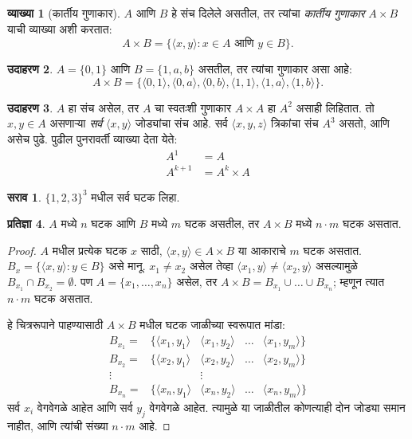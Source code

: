 \documentclass[11pt,a4paper,openany]{book}
\theoremstyle{definition}
\newtheorem{defn}{व्याख्या}[section]
\newtheorem{ex}[defn]{उदाहरण}
\newtheorem{prop}[defn]{प्रतिज्ञा}
\newtheorem{prob}{सराव}[chapter]
\newcommand{\Setabs}[2]{\{#1:#2\}}
\newcommand{\tuple}[1]{\langle #1\rangle}
\begin{document}
\begin{defn}[कार्तीय गुणाकार]
$A$ आणि $B$ हे संच दिलेले असतील, तर त्यांचा \emph{कार्तीय गुणाकार}
$A \times B$ याची व्याख्या अशी करतात:
\[
  A \times B = \Setabs{\tuple{x, y}}{x \in A \text{ आणि } y \in B}.
\]
\end{defn}

\begin{ex}
$A = \{0, 1\}$ आणि $B = \{1, a, b\}$ असतील, तर त्यांचा गुणाकार असा आहे:
\[
A \times B = \{ \tuple{0, 1}, \tuple{0, a}, \tuple{0, b},
    \tuple{1, 1}, \tuple{1, a}, \tuple{1, b} \}.
\]
\end{ex}

\begin{ex}
$A$ हा संच असेल, तर $A$ चा स्वतःशी गुणाकार $A \times A$ हा $A^2$
असाही लिहितात. तो $x, y \in A$ असणाऱ्या \emph{सर्व} $\tuple{x, y}$ जोड्यांचा
संच आहे. सर्व $\tuple{x, y, z}$ त्रिकांचा संच $A^3$ असतो, आणि असेच पुढे.
पुढील पुनरावर्ती व्याख्या देता येते:
\begin{align*}
  A^1 & = A\\
  A^{k+1} & = A^k \times A
\end{align*}
\end{ex}

\begin{prob}
$\{1, 2, 3\}^3$ मधील सर्व घटक लिहा.
\end{prob}

\begin{prop}\label{sfr:set:pai:cardnmprod}
$A$ मध्ये $n$ घटक आणि $B$ मध्ये $m$ घटक असतील,
तर $A
\times B$ मध्ये $n\cdot m$ घटक असतात.
\end{prop}

\begin{proof}
$A$ मधील प्रत्येक घटक $x$ साठी, $\tuple{x, y} \in A \times B$
या आकाराचे $m$ घटक असतात.
$B_x = \Setabs{\tuple{x, y}}{y
  \in B}$ असे मानू. $x_1 \neq x_2$ असेल तेव्हा $\tuple{x_1, y} \neq
\tuple{x_2, y}$ असल्यामुळे $B_{x_1} \cap B_{x_2} = \emptyset$.
पण $A = \{x_1,
\dots, x_n\}$ असेल, तर $A \times B = B_{x_1} \cup \dots \cup B_{x_n}$;
म्हणून त्यात $n\cdot m$ घटक असतात.

हे चित्ररूपाने पाहण्यासाठी $A \times B$ मधील घटक जाळीच्या स्वरूपात मांडा:
\[
\begin{array}{rcccc}
  B_{x_1} = & \{\tuple{x_1, y_1} & \tuple{x_1, y_2} & \dots & \tuple{x_1, y_m}\}\\
  B_{x_2} = & \{\tuple{x_2, y_1} & \tuple{x_2, y_2} & \dots & \tuple{x_2, y_m}\}\\
  \vdots & & \vdots\\
  B_{x_n} = & \{\tuple{x_n, y_1} & \tuple{x_n, y_2} & \dots & \tuple{x_n, y_m}\}
\end{array}
\]
सर्व $x_i$ वेगवेगळे आहेत आणि सर्व $y_j$ वेगवेगळे आहेत. त्यामुळे या जाळीतील
कोणत्याही दोन जोड्या समान नाहीत, आणि त्यांची संख्या $n\cdot m$ आहे.
\end{proof}
\end{document}
